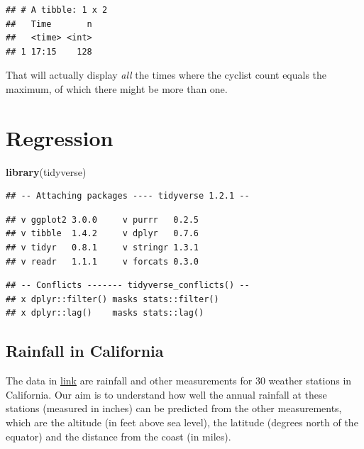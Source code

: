 \documentclass[]{tufte-book}
\newenvironment{Shaded}{}{}
\newcommand{\KeywordTok}[1]{\textcolor[rgb]{0.00,0.44,0.13}{\textbf{#1}}}
\newcommand{\NormalTok}[1]{#1}
\newcommand{\OperatorTok}[1]{\textcolor[rgb]{0.40,0.40,0.40}{#1}}
\newcommand{\StringTok}[1]{\textcolor[rgb]{0.25,0.44,0.63}{#1}}
\theoremstyle{definition}
\theoremstyle{definition}
\theoremstyle{definition}
\theoremstyle{remark}
\begin{document}
\begin{Shaded}
\end{Shaded}

\begin{verbatim}
## # A tibble: 1 x 2
##   Time       n
##   <time> <int>
## 1 17:15    128
\end{verbatim}

That will actually display \emph{all} the times where the cyclist count
equals the maximum, of which there might be more than one.

\hypertarget{regression}{%
\chapter{Regression}\label{regression}}

\begin{Shaded}
\begin{Highlighting}[]
\KeywordTok{library}\NormalTok{(tidyverse)}
\end{Highlighting}
\end{Shaded}

\begin{verbatim}
## -- Attaching packages ---- tidyverse 1.2.1 --
\end{verbatim}

\begin{verbatim}
## v ggplot2 3.0.0     v purrr   0.2.5
## v tibble  1.4.2     v dplyr   0.7.6
## v tidyr   0.8.1     v stringr 1.3.1
## v readr   1.1.1     v forcats 0.3.0
\end{verbatim}

\begin{verbatim}
## -- Conflicts ------- tidyverse_conflicts() --
## x dplyr::filter() masks stats::filter()
## x dplyr::lag()    masks stats::lag()
\end{verbatim}

\hypertarget{rainfall-in-california}{%
\section{Rainfall in California}\label{rainfall-in-california}}

The data in
\href{http://www.utsc.utoronto.ca/~butler/c32/calirain.txt}{link} are
rainfall and other measurements for 30 weather stations in California.
Our aim is to understand how well the annual rainfall at these stations
(measured in inches) can be predicted from the other measurements, which
are the altitude (in feet above sea level), the latitude (degrees north
of the equator) and the distance from the coast (in miles).
\end{document}
